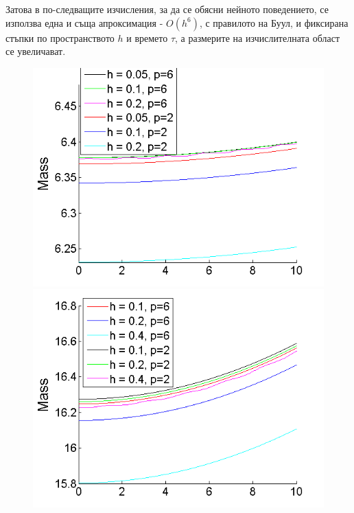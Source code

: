\documentclass[a4paper]{article}
\theoremstyle{remark}
\begin{document}
\begin{large}
Затова в по-следващите изчисления, за да се обясни нейното поведението, се използва една и съща апроксимация - $O(h^6)$, с правилото на Буул, и фиксирана стъпки по пространството $h$ и времето $\tau$, а размерите на изчислителната област се увеличават.
\begin{figure}[ht]\vspace{0.4cm}
	\begin{minipage}[b]{0.51\linewidth}
		 \includegraphics[width=\linewidth]{Mass/Mass_bt3_c045_h005_010_020_Taylor_Conservative.png}
	\end{minipage}	
	\begin{minipage}[b]{0.51\linewidth}
		\includegraphics[width=\linewidth]{Mass/Mass_bt1_c090_h010_020_040_Taylor_Conservative.png}		

\end{minipage}
\end{figure}
\end{large}
\end{document}
